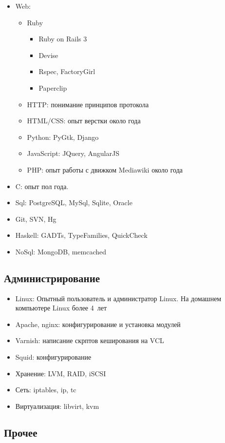 \documentclass[11pt,a4paper,sans]{moderncv}        %
\begin{document}
\begin{itemize}
\item Web:
  \begin{itemize}
  \item Ruby
    \begin{itemize}
    \item Ruby on Rails 3
    \item Devise
    \item Rspec, FactoryGirl
    \item Paperclip
    \end{itemize}
  \item HTTP: понимание принципов протокола
  \item HTML/CSS: опыт верстки около года
  \item Python: PyGtk, Django
  \item JavaScript: JQuery, AngularJS
  \item PHP: опыт работы с движком Mediawiki около года
  \end{itemize}
\item C: опыт пол года.
\item Sql: PostgreSQL, MySql, Sqlite, Oracle
\item Git, SVN, Hg
\item Haskell: GADTs, TypeFamilies, QuickCheck
\item NoSql: MongoDB, memcached
\end{itemize}

\subsection{Администрирование}

\begin{itemize}
\item Linux: Опытный пользователь и администратор Linux.  На домашнем
  компьютере Linux более \hbox{4 лет}
\item Apache, nginx: конфигурирование и установка модулей
\item Varnish: написание скрптов кеширования на VCL
\item Squid: конфигурирование
\item Хранение: LVM, RAID, iSCSI
\item Сеть: iptables, ip, tc
\item Виртуализация: libvirt, kvm
\end{itemize}

\subsection{Прочее}
\end{document}
